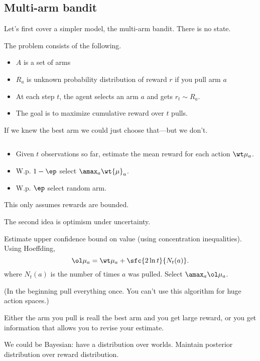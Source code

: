 \subsection{Multi-arm bandit}

Let's first cover a simpler model, the multi-arm bandit. There is no state.

\begin{df}
The  problem consists of the following.
\begin{itemize}
\item
$A$ is a set of arms
\item
$R_a$ is unknown probability distribution of reward $r$ if you pull arm $a$
\item
At each step $t$, the agent selects an arm $a$ and gets $r_t\sim R_a$.
\item
The goal is to maximize cumulative reward over $t$ pulls.
\end{itemize}
\end{df}
If we knew the best arm we could just choose that---but we don't.

\begin{alg}
$\,$
\begin{itemize}
\item
Given $t$ observations so far, estimate the mean reward for each action $\wt\mu_a$.
\item
W.p. $1-\ep$ select $\amax_a\wt{\mu}_a$.
\item
W.p. $\ep$ select random arm.
\end{itemize}
\end{alg}

This only assumes rewards are bounded.

The second idea is optimism under uncertainty.
\begin{alg}[UCB]
Estimate upper confidence bound on value (using concentration inequalities). Using Hoeffding, 
$$
\ol\mu_a = \wt\mu_a + \sfc{2\ln t}{N_t(a)}.
$$
where $N_t(a)$ is the number of times $a$ was pulled.
Select $\amax_a\ol\mu_a$.
\end{alg}
(In the beginning pull everything once. You can't use this algorithm for huge action spaces.) 

Either the arm you pull is reall the best arm and you get large reward, or you get information that allows you to revise your estimate.

We could be Bayesian: have a distribution over worlds. Maintain posterior distribution over reward distribution. 

